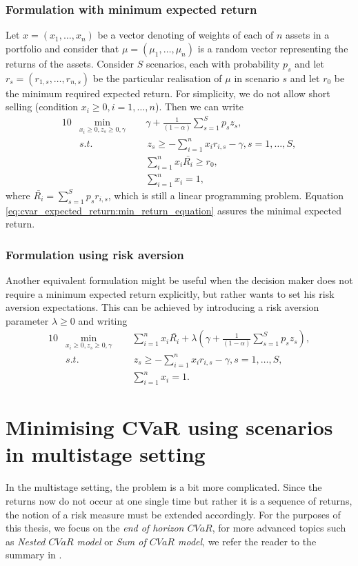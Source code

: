 \subsubsection*{Formulation with minimum expected return}
Let $x=(x_1,\dots,x_n)$ be a vector denoting of weights of each of $n$ assets in a portfolio and consider that $\mu=(\mu_1,\dots,\mu_n)$ is a random vector representing the returns of the assets. Consider $S$ scenarios, each with probability $p_s$ and let $r_s = (r_{1,s},\dots,r_{n,s})$ be the particular realisation of $\mu$ in scenario $s$ and let $r_0$ be the minimum required expected return. For simplicity, we do not allow short selling (condition $x_i \geq 0, i=1,\dots,n$). Then we can write
\begin{alignat}{10}
& \underset{x_i \geq 0 , z_s \geq 0, \gamma}{\min}  \, \, \, && \gamma + \frac{1}{(1-\alpha)} \sum_{s=1}^S p_s z_s, \label{cvar_expected_return}  \\
&s.t. && \, z_s \geq  -\sum_{i=1}^{n} x_i r_{i,s} -\gamma, s=1,\dots,S, \nonumber \\
&  && \sum_{i=1}^{n} x_i \bar{R_i} \geq r_0, \label{eq:cvar_expected_return:min_return_equation} \\
&  && \sum_{i=1}^{n} x_i = 1, \nonumber
\end{alignat}
where $\bar{R_i}=\sum_{s=1}^{S}p_s r_{i,s}$, which is still a linear programming problem. Equation \ref{eq:cvar_expected_return:min_return_equation} assures the minimal expected return.
\subsubsection*{Formulation using risk aversion}
Another equivalent formulation might be useful when the decision maker does not require a minimum expected return explicitly, but rather wants to set his risk aversion expectations. This can be achieved by introducing a risk aversion parameter $\lambda \geq 0$ and writing
\begin{alignat}{10}
& \underset{x_i \geq 0 , z_s \geq 0, \gamma}{\min}  \, \, \, && \sum_{i=1}^{n} x_i \bar{R_i} + \lambda \left( \gamma + \frac{1}{(1-\alpha)} \sum_{s=1}^S p_s z_s \right), \label{eq:cvar_risk_aversion} \\
&s.t. && \, z_s \geq  -\sum_{i=1}^{n} x_i r_{i,s} -\gamma, s=1,\dots,S, \nonumber \\
&  && \sum_{i=1}^{n} x_i = 1. \nonumber
\end{alignat}
\section{Minimising CVaR using scenarios in multistage setting}
In the multistage setting, the problem is a bit more complicated. Since the returns now do not occur at one single time but rather it is a sequence of returns, the notion of a risk measure must be extended accordingly. For the purposes of this thesis, we focus on the \textit{end of horizon $CVaR$}, for more advanced topics such as \textit{Nested $CVaR$ model} or \textit{Sum of $CVaR$ model}, we refer the reader to the summary in \cite[Section 1.4.]{kozmikv_phdthesis}.


